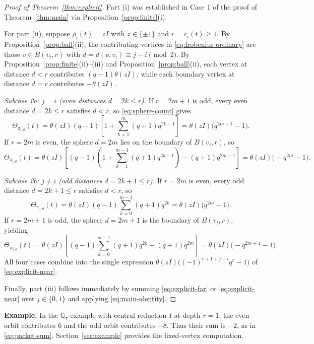 \documentclass[12pt, letterpaper]{article}
\numberwithin{equation}{section}
\theoremstyle{definition}
\theoremstyle{remark}
\begin{document}
\begin{proof}[Proof of Theorem~\ref{thm:explicit}]
Part (i) was established in Case 1 of the proof of Theorem~\ref{thm:main} via Proposition~\ref{prop:finite}(i).

For part (ii), suppose $\rho_i(t)=zI$ with $z\in\{\pm 1\}$ and $r=r_i(t)\ge 1$. By Proposition~\ref{prop:ball}(ii), the contributing vertices in \eqref{eq:frobenius-ordinary} are those $v\in B(v_i,r)$ with $d=d(v,v_i)\equiv j-i\pmod{2}$. By Proposition~\ref{prop:finite}(ii)--(iii) and Proposition~\ref{prop:ball}(ii), each vertex at distance $d<r$ contributes $(q-1)\theta(zI)$, while each boundary vertex at distance $d=r$ contributes $-\theta(zI)$.

\emph{Subcase 2a: $j=i$ (even distances $d=2k\le r$).} If $r=2m+1$ is odd, every even distance $d=2k\le r$ satisfies $d<r$, so \eqref{eq:sphere-count} gives
\[
 \Theta_{\pi_{i,\theta}}(t)=\theta(zI)(q-1)\left[1+\sum_{k=1}^m (q+1)q^{2k-1}\right]
 =\theta(zI)\bigl(q^{2m+1}-1\bigr).
\]
If $r=2m$ is even, the sphere $d=2m$ lies on the boundary of $B(v_i,r)$, so
\[
 \Theta_{\pi_{i,\theta}}(t)=\theta(zI)\left[(q-1)\left(1+\sum_{k=1}^{m-1}(q+1)q^{2k-1}\right)-(q+1)q^{2m-1}\right]
 =\theta(zI)\bigl(-q^{2m}-1\bigr).
\]

\emph{Subcase 2b: $j\ne i$ (odd distances $d=2k+1\le r$).} If $r=2m$ is even, every odd distance $d=2k+1\le r$ satisfies $d<r$, so
\[
 \Theta_{\pi_{j,\theta}}(t)=\theta(zI)(q-1)\sum_{k=0}^{m-1}(q+1)q^{2k}
 =\theta(zI)\bigl(q^{2m}-1\bigr).
\]
If $r=2m+1$ is odd, the sphere $d=2m+1$ is the boundary of $B(v_i,r)$, yielding
\[
 \Theta_{\pi_{j,\theta}}(t)=\theta(zI)\left[(q-1)\sum_{k=0}^{m-1}(q+1)q^{2k}-(q+1)q^{2m}\right]
 =\theta(zI)\bigl(-q^{2m+1}-1\bigr).
\]
All four cases combine into the single expression $\theta(zI)\bigl((-1)^{r+1+j-i}q^r-1\bigr)$ of \eqref{eq:explicit-near}.

Finally, part (iii) follows immediately by summing \eqref{eq:explicit-far} or \eqref{eq:explicit-near} over $j\in\{0,1\}$ and applying \eqref{eq:main-identity}.
\end{proof}

\noindent\textbf{Example.} In the $\mathbb{Q}_7$ example with central reduction $I$ at depth $r=1$, the even orbit contributes $6$ and the odd orbit contributes $-8$. Thus their sum is $-2$, as in \eqref{eq:packet-sum}. Section~\ref{sec:example} provides the fixed-vertex computation.
\end{document}

